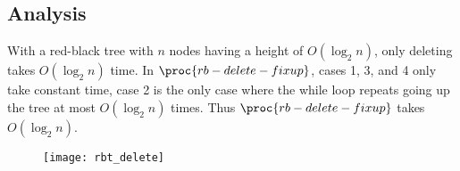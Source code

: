 \documentclass[12pt]{article}
\begin{document}
\subsection*{Analysis}
With a red-black tree with $n$ nodes having a height of $O(\log_{2}n)$, only deleting takes $O(\log_{2}n)$ time. In $\proc{rb-delete-fixup}$, cases 1, 3, and 4 only take constant time, case 2 is the only case where the while loop repeats going up the tree at most $O(\log_{2}n)$ times. Thus $\proc{rb-delete-fixup}$ takes $O(\log_{2}n)$.

\newpage

\begin{figure}[!ht]
\texttt{[image: rbt\_delete]}
\label{fig: rbt_delete}
\end{figure}
\end{document}

